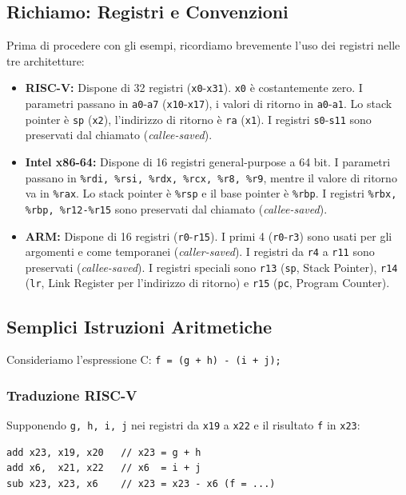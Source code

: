 \documentclass[12pt, a4paper]{article}
\begin{document}
\subsection{Richiamo: Registri e Convenzioni}
Prima di procedere con gli esempi, ricordiamo brevemente l'uso dei registri nelle tre architetture:
\begin{itemize}
    \item \textbf{RISC-V:} Dispone di 32 registri (\texttt{x0}-\texttt{x31}). \texttt{x0} è costantemente zero. I parametri passano in \texttt{a0}-\texttt{a7} (\texttt{x10}-\texttt{x17}), i valori di ritorno in \texttt{a0}-\texttt{a1}. Lo stack pointer è \texttt{sp} (\texttt{x2}), l'indirizzo di ritorno è \texttt{ra} (\texttt{x1}). I registri \texttt{s0}-\texttt{s11} sono preservati dal chiamato (\textit{callee-saved}).
    \item \textbf{Intel x86-64:} Dispone di 16 registri general-purpose a 64 bit. I parametri passano in \texttt{\%rdi, \%rsi, \%rdx, \%rcx, \%r8, \%r9}, mentre il valore di ritorno va in \texttt{\%rax}. Lo stack pointer è \texttt{\%rsp} e il base pointer è \texttt{\%rbp}. I registri \texttt{\%rbx, \%rbp, \%r12-\%r15} sono preservati dal chiamato (\textit{callee-saved}).
    \item \textbf{ARM:} Dispone di 16 registri (\texttt{r0}-\texttt{r15}). I primi 4 (\texttt{r0}-\texttt{r3}) sono usati per gli argomenti e come temporanei (\textit{caller-saved}). I registri da \texttt{r4} a \texttt{r11} sono preservati (\textit{callee-saved}). I registri speciali sono \texttt{r13} (\texttt{sp}, Stack Pointer), \texttt{r14} (\texttt{lr}, Link Register per l'indirizzo di ritorno) e \texttt{r15} (\texttt{pc}, Program Counter).
\end{itemize}

\subsection{Semplici Istruzioni Aritmetiche}
Consideriamo l'espressione C: \texttt{f = (g + h) - (i + j);}

\subsubsection{Traduzione RISC-V}
Supponendo \texttt{g, h, i, j} nei registri da \texttt{x19} a \texttt{x22} e il risultato \texttt{f} in \texttt{x23}:
\begin{verbatim}
add x23, x19, x20   // x23 = g + h
add x6,  x21, x22   // x6  = i + j
sub x23, x23, x6    // x23 = x23 - x6 (f = ...)
\end{verbatim}
\end{document}
